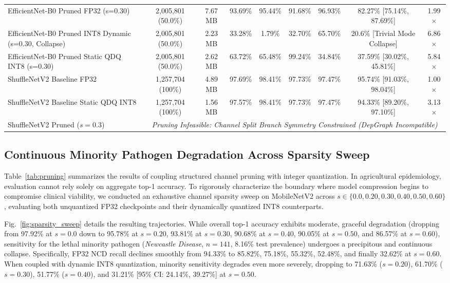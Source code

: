 \documentclass{jcse}
\begin{document}
\begin{table}
{\begin{tabular}{lcccccccc}
EfficientNet-B0 Pruned FP32 (s=0.30) & 2,005,801 (50.0\%) & 7.67 MB & 93.69\% & 95.44\% & 91.68\% & 96.93\% & 82.27\% [75.14\%, 87.69\%] & 1.99$\times$ \\
EfficientNet-B0 Pruned INT8 Dynamic (s=0.30, Collapse) & 2,005,801 (50.0\%) & 2.23 MB & 33.28\% & 1.79\% & 32.70\% & 65.70\% & 20.6\% [Trivial Mode Collapse] & 6.86$\times$ \\
EfficientNet-B0 Pruned Static QDQ INT8 (s=0.30) & 2,005,801 (50.0\%) & 2.62 MB & 63.72\% & 65.48\% & 99.24\% & 34.84\% & 37.59\% [30.02\%, 45.81\%] & 5.84$\times$ \\
\midrule
ShuffleNetV2 Baseline FP32 & 1,257,704 (100\%) & 4.89 MB & 97.69\% & 98.41\% & 97.73\% & 97.47\% & 95.74\% [91.03\%, 98.04\%] & 1.00$\times$ \\
ShuffleNetV2 Baseline Static QDQ INT8 & 1,257,704 (100\%) & 1.56 MB & 97.57\% & 98.41\% & 97.73\% & 97.47\% & 94.33\% [89.20\%, 97.10\%] & 3.13$\times$ \\
ShuffleNetV2 Pruned ($s=0.3$) & \multicolumn{8}{c}{\textit{Pruning Infeasible: Channel Split Branch Symmetry Constrained (DepGraph Incompatible)}} \\
\bottomrule
\end{tabular}%
}
\end{table}

\subsection{Continuous Minority Pathogen Degradation Across Sparsity Sweep}
Table~\ref{tab:pruning} summarizes the results of coupling structured channel pruning with integer quantization. In agricultural epidemiology, evaluation cannot rely solely on aggregate top-1 accuracy. To rigorously characterize the boundary where model compression begins to compromise clinical viability, we conducted an exhaustive channel sparsity sweep on MobileNetV2 across $s \in \{0.0, 0.20, 0.30, 0.40, 0.50, 0.60\}$, evaluating both unquantized FP32 checkpoints and their dynamically quantized INT8 counterparts.

Fig.~\ref{fig:sparsity_sweep} details the resulting trajectories. While overall top-1 accuracy exhibits moderate, graceful degradation (dropping from 97.92\% at $s=0.0$ down to 95.78\% at $s=0.20$, 93.81\% at $s=0.30$, 90.68\% at $s=0.40$, 90.05\% at $s=0.50$, and 86.57\% at $s=0.60$), sensitivity for the lethal minority pathogen (\textit{Newcastle Disease}, $n=141$, 8.16\% test prevalence) undergoes a precipitous and continuous collapse. Specifically, FP32 NCD recall declines smoothly from 94.33\% to 85.82\%, 75.18\%, 55.32\%, 52.48\%, and finally 32.62\% at $s=0.60$. When coupled with dynamic INT8 quantization, minority sensitivity degrades even more severely, dropping to 71.63\% ($s=0.20$), 61.70\% ($s=0.30$), 51.77\% ($s=0.40$), and 31.21\% [95\% CI: 24.14\%, 39.27\%] at $s=0.50$.
\end{document}
